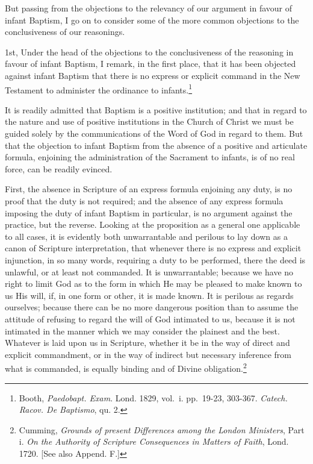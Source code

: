 \documentclass[]{book}
\begin{document}
But passing from the objections to the relevancy of our argument in favour of infant Baptism, I go on to consider some of the more common objections to the conclusiveness of our reasonings.

1st, Under the head of the objections to the conclusiveness of the reasoning in favour of infant Baptism, I remark, in the first place, that it has been objected against infant Baptism that there is no express or explicit command in the New Testament to administer the ordinance to infants.\footnote{Booth, \emph{Paedobapt. Exam}. Lond. 1829, vol.~i. pp.~19-23, 303-367. \emph{Catech. Racov. De Baptismo}, qu. 2.}

It is readily admitted that Baptism is a positive institution; and that in regard to the nature and use of positive institutions in the Church of Christ we must be guided solely by the communications of the Word of God in regard to them. But that the objection to infant Baptism from the absence of a positive and articulate formula, enjoining the administration of the Sacrament to infants, is of no real force, can be readily evinced.

First, the absence in Scripture of an express formula enjoining any duty, is no proof that the duty is not required; and the absence of any express formula imposing the duty of infant Baptism in particular, is no argument against the practice, but the reverse. Looking at the proposition as a general one applicable to all cases, it is evidently both unwarrantable and perilous to lay down as a canon of Scripture interpretation, that whenever there is no express and explicit injunction, in so many words, requiring a duty to be performed, there the deed is unlawful, or at least not commanded. It is unwarrantable; because we have no right to limit God as to the form in which He may be pleased to make known to us His will, if, in one form or other, it is made known. It is perilous as regards ourselves; because there can be no more dangerous position than to assume the attitude of refusing to regard the will of God intimated to us, because it is not intimated in the manner which we may consider the plainest and the best. Whatever is laid upon us in Scripture, whether it be in the way of direct and explicit commandment, or in the way of indirect but necessary inference from what is commanded, is equally binding and of Divine obligation.\footnote{Cumming, \emph{Grounds of present Differences among the London Ministers}, Part i. \emph{On the Authority of Scripture Consequences in Matters of Faith}, Lond. 1720. {[}See also Append. F.{]}}
\end{document}
